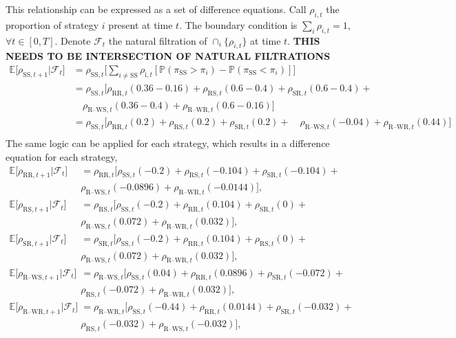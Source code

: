 This relationship can be expressed as a set of difference equations. Call $\rho_{i,t}$ the proportion of strategy $i$ present at time $t$. The boundary condition is $\sum_i \rho_{i,t}= 1$, $\forall t \in [0,T]$. Denote $\mathcal F_t$ the natural filtration of $\cap_i \{\rho_{i,t} \}$ at time $t$. \textbf{THIS NEEDS TO BE INTERSECTION OF NATURAL FILTRATIONS}  \\
\begin{align*}
    \mathbb E \big [\rho_{\text{SS},t+1}| \mathcal F_t \big ] &= \rho_{\text{SS},t} \Bigg [\sum_{ i \neq \text{SS}}  \rho_{\text{i},t} [\mathbb P (\pi_\text{SS} > \pi_{i}) -\mathbb P (\pi_\text{SS} < \pi_{i}) ] \Bigg ] \\
    &= \rho_{\text{SS},t}\Bigg [\rho_{\text{RR}, t}(0.36-0.16) + \rho_{\text{RS}, t}(0.6-0.4) + \rho_{\text{SR}, t}(0.6-0.4) + \\
     & \quad \rho_{\text{R--WS}, t}(0.36-0.4) + \rho_{\text{R--WR}, t}(0.6-0.16) \Bigg ] \\
    &= \rho_{\text{SS},t}\Bigg [\rho_{\text{RR}, t}(0.2) + \rho_{\text{RS}, t}(0.2) + \rho_{\text{SR}, t}(0.2) + 
      \quad \rho_{\text{R--WS}, t}(-0.04) + \rho_{\text{R--WR}, t}(0.44) \Bigg ] \\
\end{align*}
The same logic can be applied for each strategy, which results in a difference equation for each strategy, \\
\begin{align*}
    \mathbb E \big [\rho_{\text{RR},t+1}| \mathcal F_t \big ] &=\rho_{\text{RR},t}\Bigg [\rho_{\text{SS}, t}(-0.2) + \rho_{\text{RS}, t}(-0.104) +  \rho_{\text{SR}, t}(-0.104) + \\ & \rho_{\text{R--WS}, t}(-0.0896) + \rho_{\text{R--WR}, t}(-0.0144) \Bigg ], \\
    \mathbb E \big [\rho_{\text{RS},t+1}| \mathcal F_t \big ] &=\rho_{\text{RS},t}\Bigg [\rho_{\text{SS}, t}(-0.2) + \rho_{\text{RR}, t}(0.104) +  \rho_{\text{SR}, t}(0) + \\ & \rho_{\text{R--WS}, t}(0.072) + \rho_{\text{R--WR}, t}(0.032) \Bigg ] ,\\
    \mathbb E \big [\rho_{\text{SR},t+1}| \mathcal F_t \big ] &=\rho_{\text{SR},t}\Bigg [\rho_{\text{SS}, t}(-0.2) + \rho_{\text{RR}, t}(0.104) +  \rho_{\text{RS}, t}(0) + \\ & \rho_{\text{R--WS}, t}(0.072) + \rho_{\text{R--WR}, t}(0.032) \Bigg ] ,\\
    \mathbb E \big [\rho_{\text{R--WS},t+1}| \mathcal F_t \big ] &=\rho_{\text{R--WS},t}\Bigg [\rho_{\text{SS}, t}(0.04) + \rho_{\text{RR}, t}(0.0896) +  \rho_{\text{SR}, t}(-0.072) + \\ & \rho_{\text{RS}, t}(-0.072) + \rho_{\text{R--WR}, t}(0.032) \Bigg ] , \\
\mathbb E \big [\rho_{\text{R--WR},t+1}| \mathcal F_t \big ] &=\rho_{\text{R--WR},t}\Bigg [\rho_{\text{SS}, t}(-0.44) + \rho_{\text{RR}, t}(0.0144) +  \rho_{\text{SR}, t}(-0.032) + \\ & \rho_{\text{RS}, t}(-0.032) +\rho_{\text{R--WS}, t}(-0.032)  \Bigg ] , \\    
\end{align*}

